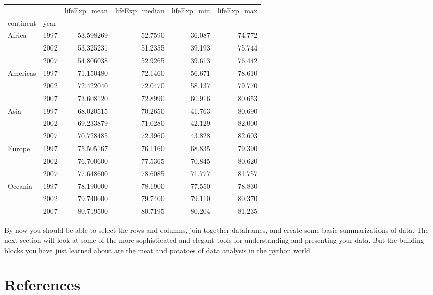 \documentclass[
  letterpaper,
  DIV=11,
  numbers=noendperiod]{scrreprt}
\newlength{\cslhangindent}
\newlength{\cslentryspacingunit} %
\newenvironment{CSLReferences}[2] %
 {%
  \setlength{\parindent}{0pt}
  \ifodd #1
  \let\oldpar\par
  \def\par{\hangindent=\cslhangindent\oldpar}
  \fi
  \setlength{\parskip}{#2\cslentryspacingunit}
 }%
 {}
\begin{document}
\begin{tcolorbox}
\begin{tabular}{llrrrr}
\toprule
        &      &  lifeExp\_mean &  lifeExp\_median &  lifeExp\_min &  lifeExp\_max \\
continent & year &               &                 &              &              \\
\midrule
Africa & 1997 &     53.598269 &         52.7590 &       36.087 &       74.772 \\
        & 2002 &     53.325231 &         51.2355 &       39.193 &       75.744 \\
        & 2007 &     54.806038 &         52.9265 &       39.613 &       76.442 \\
Americas & 1997 &     71.150480 &         72.1460 &       56.671 &       78.610 \\
        & 2002 &     72.422040 &         72.0470 &       58.137 &       79.770 \\
        & 2007 &     73.608120 &         72.8990 &       60.916 &       80.653 \\
Asia & 1997 &     68.020515 &         70.2650 &       41.763 &       80.690 \\
        & 2002 &     69.233879 &         71.0280 &       42.129 &       82.000 \\
        & 2007 &     70.728485 &         72.3960 &       43.828 &       82.603 \\
Europe & 1997 &     75.505167 &         76.1160 &       68.835 &       79.390 \\
        & 2002 &     76.700600 &         77.5365 &       70.845 &       80.620 \\
        & 2007 &     77.648600 &         78.6085 &       71.777 &       81.757 \\
Oceania & 1997 &     78.190000 &         78.1900 &       77.550 &       78.830 \\
        & 2002 &     79.740000 &         79.7400 &       79.110 &       80.370 \\
        & 2007 &     80.719500 &         80.7195 &       80.204 &       81.235 \\
\bottomrule
\end{tabular}

\end{tcolorbox}

By now you should be able to select the rows and columns, join together
dataframes, and create some basic summarizations of data. The next
section will look at some of the more sophisticated and elegant tools
for understanding and presenting your data. But the building blocks you
have just learned about are the meat and potatoes of data analysis in
the python world.


\hypertarget{references}{%
\chapter*{References}\label{references}}

\hypertarget{refs}{}
\begin{CSLReferences}{0}{0}
\end{CSLReferences}
\end{document}
